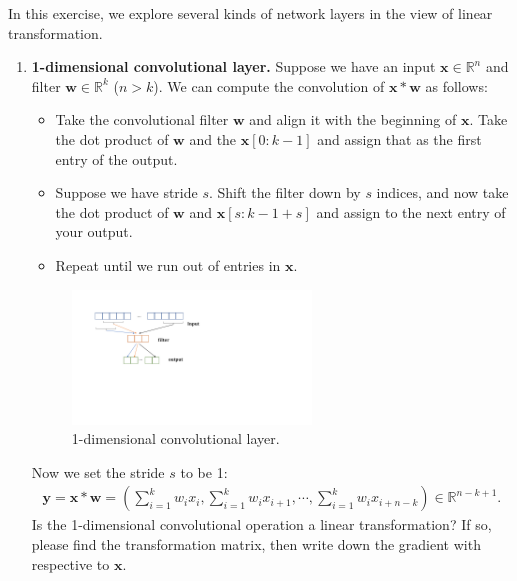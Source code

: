 \documentclass[11pt,letter,notitlepage]{article}
\begin{document}
\newpage
\begin{exercise}
In this exercise, we explore several kinds of network layers in the view of linear transformation.
\begin{enumerate}
\item \textbf{1-dimensional convolutional layer.} Suppose we have an input $\mathbf{x}\in\mathbb{R}^n$ and filter $\mathbf{w}\in\mathbb{R}^k$ ($n>k$). We can compute the convolution of $\mathbf{x}\ast \mathbf{w}$ as follows:
    \begin{itemize}
      \item Take the convolutional filter $\mathbf{w}$ and align it with the beginning of $\mathbf{x}$. Take the dot product of $\mathbf{w}$ and the $\mathbf{x}[0 : k -1]$ and assign that as the first entry of the output.
      \item Suppose we have stride $s$. Shift the filter down by $s$ indices, and now take the dot product of $\mathbf{w}$ and $\textbf{x}[s : k - 1 +s]$ and assign to the next entry of your output.
      \item Repeat until we run out of entries in $\mathbf{x}$.
    \end{itemize}
    
    \begin{figure}[H]
              \centering
              \includegraphics[width=0.6\textwidth]{Figures/1dimensioal_convolution}
              \caption{1-dimensional convolutional layer.}
            \end{figure}
    
    
    Now we set the stride $s$ to be 1:
    \begin{align*}
    \mathbf{y}=\mathbf{x}\ast \mathbf{w}=\left(\sum_{i=1}^kw_ix_i,\sum_{i=1}^kw_ix_{i+1},\cdots, \sum_{i=1}^kw_ix_{i+n-k}\right)\in\mathbb{R}^{n-k+1}.
    \end{align*}
    Is the 1-dimensional convolutional operation a linear transformation? If so, please find the transformation matrix, then write down the gradient with respective to $\mathbf{x}$.


\end{enumerate}
\end{exercise}
\end{document}
